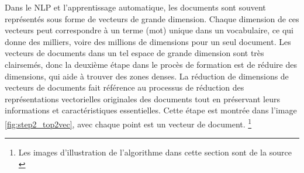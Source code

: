 Dans le NLP et l’apprentissage automatique, les documents sont souvent représentés sous forme de vecteurs de grande dimension. Chaque dimension de ces vecteurs peut correspondre à un terme (mot) unique dans un vocabulaire, ce qui donne des milliers, voire des millions de dimensions pour un seul document.
Les vecteurs de documents dans un tel espace de grande dimension sont très clairsemés, donc la deuxième étape dans le procès de formation est de réduire des dimensions, qui aide à trouver des zones denses. 
La réduction de dimensions de vecteurs de documents fait référence au processus de réduction des représentations vectorielles originales des documents tout en préservant leurs informations et caractéristiques essentielles.
Cette étape est montrée dans l'image \ref{fig:step2_top2vec}, avec chaque point est un vecteur de document. \footnote{Les images d'illustration de l'algorithme dans cette section sont de la source \cite{Ddangelov}}

